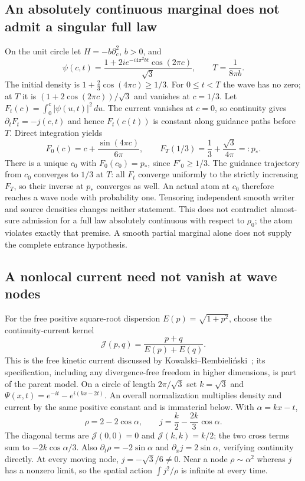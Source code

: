 \documentclass[11pt]{article}
\numberwithin{equation}{section}
\theoremstyle{definition}
\theoremstyle{remark}
\begin{document}
\subsection[Singular full laws despite regular marginals]{An absolutely continuous marginal does not admit a singular full law}\label{p3r:singular}
On the unit circle let $H=-b\partial_c^2$, $b>0$, and
\[
 \psi(c,t)=\frac{1+2i e^{-i4\pi^2bt}\cos(2\pi c)}{\sqrt3},
 \qquad T=\frac{1}{8\pi b}.
\]
The initial density is $1+\tfrac23\cos(4\pi c)\ge1/3$. For $0\le t<T$ the wave has no zero; at $T$ it is $(1+2\cos(2\pi c))/\sqrt3$ and vanishes at $c=1/3$. Let $F_t(c)=\int_0^c|\psi(u,t)|^2\,du$. The current vanishes at $c=0$, so continuity gives $\partial_tF_t=-j(c,t)$ and hence $F_t(c(t))$ is constant along guidance paths before $T$. Direct integration yields
\[
 F_0(c)=c+\frac{\sin(4\pi c)}{6\pi},\qquad
 F_T(1/3)=\frac13+\frac{\sqrt3}{4\pi}=:p_*.
\]
There is a unique $c_0$ with $F_0(c_0)=p_*$, since $F'_0\ge1/3$. The guidance trajectory from $c_0$ converges to $1/3$ at $T$: all $F_t$ converge uniformly to the strictly increasing $F_T$, so their inverse at $p_*$ converges as well. An actual atom at $c_0$ therefore reaches a wave node with probability one. Tensoring independent smooth writer and source densities changes neither statement. This does not contradict almost-sure admission for a full law absolutely continuous with respect to $\rho_0$; the atom violates exactly that premise. A smooth partial marginal alone does not supply the complete entrance hypothesis.

\subsection{A nonlocal current need not vanish at wave nodes}\label{p3r:nonlocal}
For the free positive square-root dispersion $E(p)=\sqrt{1+p^2}$, choose the continuity-current kernel
\[
 \mathcal J(p,q)=\frac{p+q}{E(p)+E(q)}.
\]
This is the free kinetic current discussed by Kowalski--Rembieli\'nski~\cite[Section III]{KowalskiRembielinski2011}; its specification, including any divergence-free freedom in higher dimensions, is part of the parent model. On a circle of length $2\pi/\sqrt3$ set $k=\sqrt3$ and $\Psi(x,t)=e^{-it}-e^{i(kx-2t)}$. An overall normalization multiplies density and current by the same positive constant and is immaterial below. With $\alpha=kx-t$,
\begin{equation}\label{p3r:nonlocal-formula}
 \rho=2-2\cos\alpha,\qquad
 j=\frac{k}{2}-\frac{2k}{3}\cos\alpha.
\end{equation}
The diagonal terms are $\mathcal J(0,0)=0$ and $\mathcal J(k,k)=k/2$; the two cross terms sum to $-2k\cos\alpha/3$. Also $\partial_t\rho=-2\sin\alpha$ and $\partial_xj=2\sin\alpha$, verifying continuity directly. At every moving node, $j=-\sqrt3/6\ne0$. Near a node $\rho\sim\alpha^2$ whereas $j$ has a nonzero limit, so the spatial action $\int j^2/\rho$ is infinite at every time.
\end{document}
